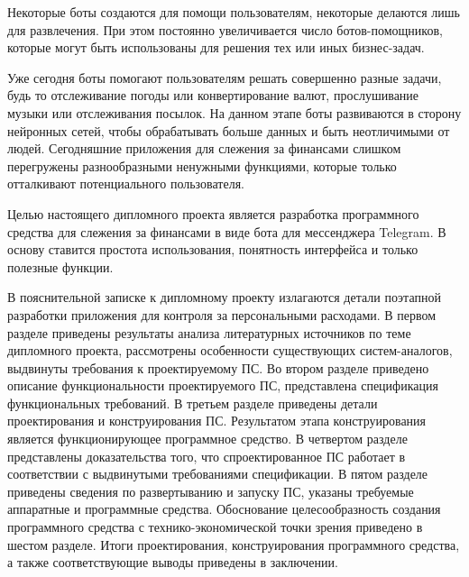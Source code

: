 Некоторые боты создаются для помощи пользователям, некоторые делаются лишь для развлечения. При этом постоянно увеличивается число ботов-помощников, которые могут быть использованы для решения тех или иных бизнес-задач.

Уже сегодня боты помогают пользователям решать совершенно разные задачи, будь то отслеживание погоды или конвертирование валют, прослушивание музыки или отслеживания посылок. На данном этапе боты развиваются в сторону нейронных сетей, чтобы обрабатывать больше данных и быть неотличимыми от людей. Сегодняшние приложения для слежения за финансами слишком перегружены разнообразными ненужными функциями, которые только отталкивают потенциального пользователя.

Целью настоящего дипломного проекта является разработка программного средства для слежения за финансами в виде бота для мессенджера Telegram. В основу ставится простота использования, понятность интерфейса и только полезные функции.

В пояснительной записке к дипломному проекту излагаются детали поэтапной разработки приложения для контроля за персональными расходами. В первом разделе приведены результаты анализа литературных источников по теме дипломного проекта, рассмотрены особенности существующих систем-аналогов, выдвинуты требования к проектируемому ПС. Во втором разделе приведено описание функциональности проектируемого ПС, представлена спецификация функциональных требований. В третьем разделе приведены детали проектирования и конструирования ПС. Результатом этапа конструирования является функционирующее программное средство. В четвертом разделе представлены доказательства того, что спроектированное ПС работает в соответствии с выдвинутыми требованиями спецификации. В пятом разделе приведены сведения по развертыванию и запуску ПС, указаны требуемые аппаратные и программные средства. Обоснование целесообразность создания программного средства с технико-экономической точки зрения приведено в шестом разделе. Итоги проектирования, конструирования программного средства, а также соответствующие выводы приведены в заключении.